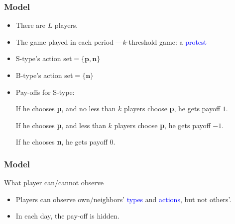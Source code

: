 \documentclass[9pt]{beamer}
\begin{document}
\begin{frame}
  \frametitle{Model}

  \begin{itemize}

\item There are $L$ players.
  \item The game played in each period ---\alert{$k$}-threshold game: a \textcolor{blue}{protest} 

\item S-type's action set$=\{\textbf{p},\textbf{n}\}$
\item B-type's action set$=\{\textbf{n}\}$






%
  \item Pay-offs for S-type:
  
\pause If he chooses \textbf{p}, and no less than \alert{$k$} players choose \textbf{p}, he gets payoff {\Huge $1$}. 

\pause If he chooses \textbf{p}, and less than \alert{$k$} players choose \textbf{p}, he gets payoff {\Huge $-1$}. 

\pause If he chooses \textbf{n}, he gets payoff {\Huge $0$}. 
 \end{itemize}

\end{frame}


\begin{frame}
  \frametitle{Model}

What player can/cannot observe

\begin{itemize}
\item Players can observe own/neighbors' \textcolor{blue}{types} and \textcolor{blue}{actions}, but not others'.
\item In each day, the pay-off is hidden. 
\end{itemize}




\end{frame}
\end{document}
